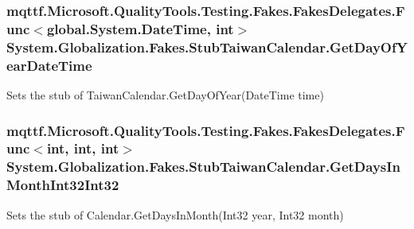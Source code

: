 \hypertarget{class_system_1_1_globalization_1_1_fakes_1_1_stub_taiwan_calendar_abb5ae5d5efad3ac0c0f039d817b45bdf}{
\subsubsection[{Get\-Day\-Of\-Year\-Date\-Time}]{\setlength{\rightskip}{0pt plus 5cm}mqttf.\-Microsoft.\-Quality\-Tools.\-Testing.\-Fakes.\-Fakes\-Delegates.\-Func$<$global.\-System.\-Date\-Time, int$>$ System.\-Globalization.\-Fakes.\-Stub\-Taiwan\-Calendar.\-Get\-Day\-Of\-Year\-Date\-Time}}\label{class_system_1_1_globalization_1_1_fakes_1_1_stub_taiwan_calendar_abb5ae5d5efad3ac0c0f039d817b45bdf}


Sets the stub of Taiwan\-Calendar.\-Get\-Day\-Of\-Year(\-Date\-Time time)

\hypertarget{class_system_1_1_globalization_1_1_fakes_1_1_stub_taiwan_calendar_aa5b50f37105306ae4e927e25b8214f7c}{
\subsubsection[{Get\-Days\-In\-Month\-Int32\-Int32}]{\setlength{\rightskip}{0pt plus 5cm}mqttf.\-Microsoft.\-Quality\-Tools.\-Testing.\-Fakes.\-Fakes\-Delegates.\-Func$<$int, int, int$>$ System.\-Globalization.\-Fakes.\-Stub\-Taiwan\-Calendar.\-Get\-Days\-In\-Month\-Int32\-Int32}}\label{class_system_1_1_globalization_1_1_fakes_1_1_stub_taiwan_calendar_aa5b50f37105306ae4e927e25b8214f7c}


Sets the stub of Calendar.\-Get\-Days\-In\-Month(\-Int32 year, Int32 month)

